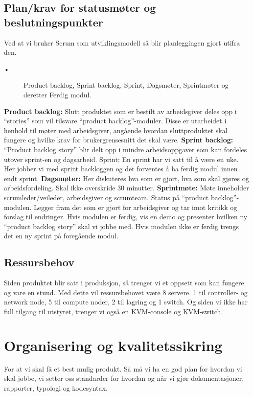 \documentclass[12pt,a4paper]{article}
\newcommand{\tab}{\hspace*{2em}}
\begin{document}
\subsection{Plan/krav for statusmøter og beslutningspunkter}
Ved at vi bruker Scrum som utviklingsmodell så blir planleggingen gjort utifra den. 
\begin{description}
	\item[\tab  •] Product backlog, Sprint backlog, Sprint, Dagsmøter, Sprintmøter og deretter Ferdig modul.
\end{description}
\textbf{Product backlog:}
\tab Slutt produktet som er bestilt av arbeidsgiver deles opp i “stories” som vil tilsvare “product backlog”-moduler. Disse er utarbeidet i henhold til møter med arbeidsgiver, angående hvordan sluttproduktet skal fungere og hvilke krav for brukergrensesnitt det skal være. \newline
\textbf{Sprint backlog:}
“Product backlog story” blir delt opp i mindre arbeidsoppgaver som kan fordeles utover sprint-en og dagsarbeid.
Sprint: En sprint har vi satt til å være en uke. Her jobber vi med sprint backloggen og det forventes å ha ferdig modul innen endt sprint. \newline
\textbf{Dagsmøter:}
Her diskuteres hva som er gjort, hva som skal gjøres og arbeidsfordeling. Skal ikke overskride 30 minutter. \newline
\textbf{Sprintmøte:}
Møte inneholder scrumleder/veileder, arbeidsgiver og scrumteam. Status på “product backlog”-modulen. Legger fram det som er gjort for arbeidsgiver og tar imot kritikk og forslag til endringer. Hvis modulen er ferdig, vis en demo og presenter hvilken ny “product backlog story” skal vi jobbe med. Hvis modulen ikke er ferdig trengs det en ny sprint på foregående modul.

\subsection{Ressursbehov}
Siden produktet blir satt i produksjon, så trenger vi et oppsett som kan fungere og vare en stund. Med dette vil ressursbehovet være 8 servere. 1 til controller- og network node, 5 til compute noder, 2 til lagring og 1 switch. Og siden vi ikke har full tilgang til utstyret, trenger vi også en KVM-console og KVM-switch.

\section{Organisering og kvalitetssikring}
For at vi skal få et best mulig produkt. Så må vi ha en god plan for hvordan vi skal jobbe, vi setter oss standarder for hvordan og når vi gjør dokumentasjoner, rapporter, typologi og kodesyntax.
\end{document}
